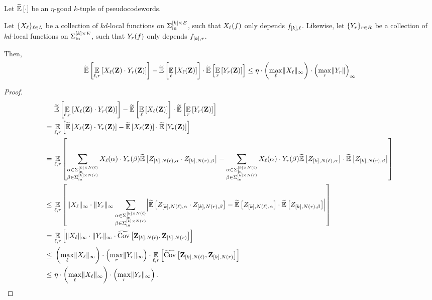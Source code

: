 \begin{lemma}\label{lem:avg_corr}
    Let $\tildeEx{\cdot}$ be an $\eta$-good $k$-tuple of pseudocodewords.
    
    Let $\{X_{{ \ell }}\}_{{ \ell } \in L}$ be a collection of $kd$-local functions on $\Sigma_{\mathrm{in}}^{[k]\times E}$, such that $X_{{ \ell }}(f)$ only depends $f_{[k],{ \ell }}$. Likewise, let $\{Y_{{ r }}\}_{{ r } \in R}$ be a collection of $kd$-local functions on $\Sigma_{\mathrm{in}}^{[k]\times E}$, such that $Y_{{ r }}(f)$ only depends $f_{[k],{ r }}$.
    
    Then,
    \begin{align*}
         \tildeEx{\Ex{\li,\ri}{X_{\li}(\zee)\cdot Y_{\ri}(\zee) }} - \tildeEx{\Ex{\li}{X_{\li}(\zee)}} \cdot \tildeEx{\Ex{\ri}{Y_{\ri}(\zee)}} \leq \eta \cdot \inparen{ \max_{\li} \norm{X_{\li}}_{\infty}} \cdot \inparen{\max_{\ri} \norm{Y_{\ri}}}_{\infty}
    \end{align*}
\end{lemma}
\begin{proof}
    \begin{align*}
    	& \tildeEx{\Ex{\li,\ri}{X_{\li}(\zee)\cdot Y_{\ri}(\zee) }} - \tildeEx{\Ex{\li}{X_{\li}(\zee)}} \cdot \tildeEx{\Ex{\ri}{Y_{\ri}(\zee)}}  \\
    	=~ & \Ex{\li,\ri}{\tildeEx{X_{\li}(\zee)\cdot Y_{\ri}(\zee) } - \tildeEx{X_{\li}(\zee)} \cdot \tildeEx{Y_{\ri}(\zee)} } \\
    	=~ & \Ex{\li,\ri}{ \sum_{\substack{\alpha \in \Sigma_{\inn}^{[k]\times N(\li)} \\ \beta \in \Sigma_{\inn}^{[k]\times N(\ri)}}} X_{\li}(\alpha) \cdot Y_{\ri}(\beta) \tildeEx{Z_{[k],N(\li),\alpha} \cdot Z_{[k],N(\ri),\beta} } - \sum_{\substack{\alpha \in \Sigma_{\inn}^{[k]\times N(\li)} \\ \beta \in \Sigma_{\inn}^{[k]\times N(\ri)}}} X_{\li}(\alpha) \cdot Y_{\ri}(\beta) \tildeEx{Z_{[k],N(\li),\alpha}} \cdot \tildeEx{Z_{[k],N(\ri),\beta} } } \\
    	\leq~ & \Ex{\li,\ri}{ \norm{X_{\li}}_{\infty} \cdot \norm{Y_{\ri}}_{\infty} \sum_{\substack{\alpha \in \Sigma_{\inn}^{[k]\times N(\li)} \\ \beta \in \Sigma_{\inn}^{[k]\times N(\ri)}}} \abs*{ \tildeEx{Z_{[k],N(\li),\alpha} \cdot Z_{[k],N(\ri),\beta} } -  \tildeEx{Z_{[k],N(\li),\alpha}} \cdot \tildeEx{Z_{[k],N(\ri),\beta} } } } \\
    	=~ & \Ex{\li,\ri}{ \norm{X_{\li}}_{\infty} \cdot \norm{Y_{\ri}}_{\infty} \cdot  \tildeCov{\zee_{[k],N(\li)}}{\zee_{[k],N(\ri)}} } \\
    	\leq~ & \inparen{\max_{\li} \norm{X_{\li}}_{\infty}} \cdot \inparen{\max_{\ri} \norm{Y_{\ri}}_{\infty}} \cdot \Ex{\li,\ri}{\tildeCov{\zee_{[k],N(\li)}}{\zee_{[k],N(\ri)}}} \\
    	\leq~ & \eta \cdot \inparen{\max_{\li} \norm{X_{\li}}_{\infty}} \cdot \inparen{\max_{\ri} \norm{Y_{\ri}}_{\infty}}.\qedhere
    \end{align*}
\end{proof}

